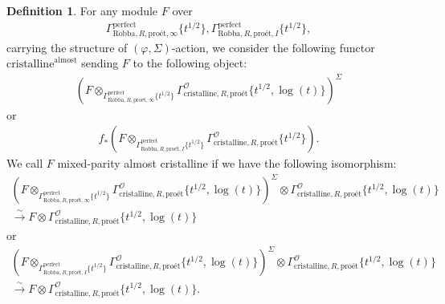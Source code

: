 \documentclass[12pt]{book}
\theoremstyle{definition}
\newtheorem{definition}{Definition}
\begin{document}
\begin{definition}
For any module $F$ over 
\begin{align}
\Gamma^\mathrm{perfect}_{\text{Robba},R,\text{pro\'et},\infty}\{t^{1/2}\},\Gamma^\mathrm{perfect}_{\text{Robba},R,\text{pro\'et},I}\{t^{1/2}\},
\end{align} 
carrying the structure of $(\varphi,\Sigma)$-action, we consider the following functor $\mathrm{cristalline}^\mathrm{almost}$ sending $F$ to the following object:
\begin{align}
(F\otimes_{\Gamma^\mathrm{perfect}_{\text{Robba},R,\text{pro\'et},\infty}\{t^{1/2}\}} \Gamma^\mathcal{O}_{\text{cristalline},R,\text{pro\'et}}\{t^{1/2},\log(t)\})^\Sigma
\end{align}
or 
\begin{align}
f_*(F\otimes_{\Gamma^\mathrm{perfect}_{\text{Robba},R,\text{pro\'et},I}\{t^{1/2}\}} \Gamma^\mathcal{O}_{\text{cristalline},R,\text{pro\'et}}\{t^{1/2}\}).
\end{align}
We call $F$ mixed-parity almost cristalline if we have the following isomorphism:
\begin{align}
(F\otimes_{\Gamma^\mathrm{perfect}_{\text{Robba},R,\text{pro\'et},\infty}\{t^{1/2}\}} \Gamma^\mathcal{O}_{\text{cristalline},R,\text{pro\'et}}\{t^{1/2},\log(t)\})^\Sigma \otimes \Gamma^\mathcal{O}_{\text{cristalline},R,\text{pro\'et}}\{t^{1/2},\log(t)\} \\
\overset{\sim}{\longrightarrow} F \otimes \Gamma^\mathcal{O}_{\text{cristalline},R,\text{pro\'et}}\{t^{1/2},\log(t)\} 
\end{align}
or 
\begin{align}
(F\otimes_{\Gamma^\mathrm{perfect}_{\text{Robba},R,\text{pro\'et},I}\{t^{1/2}\}} \Gamma^\mathcal{O}_{\text{cristalline},R,\text{pro\'et}}\{t^{1/2},\log(t)\})^\Sigma \otimes \Gamma^\mathcal{O}_{\text{cristalline},R,\text{pro\'et}}\{t^{1/2},\log(t)\}\\ \overset{\sim}{\longrightarrow} F \otimes \Gamma^\mathcal{O}_{\text{cristalline},R,\text{pro\'et}}\{t^{1/2},\log(t)\}. 
\end{align}
\end{definition}
\end{document}
